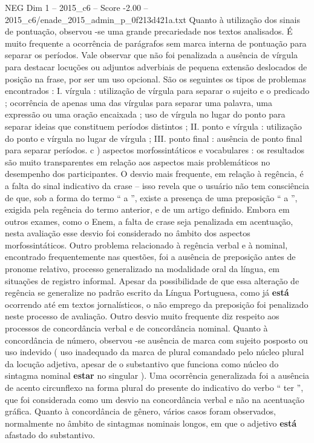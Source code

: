 \begin{textsample}{NEG Dim 1 – 2015\_c6 – Score -2.00 – 2015\_c6/enade\_2015\_admin\_p\_0f213d421a.txt}
Quanto à utilização dos sinais de pontuação, observou -se uma grande precariedade nos textos analisados.
É muito frequente a ocorrência de parágrafos sem marca interna de pontuação para separar os períodos.
Vale observar que não foi penalizada a ausência de vírgula para destacar locuções ou adjuntos adverbiais de pequena extensão deslocados de posição na frase, por ser um uso opcional.
São os seguintes os tipos de problemas encontrados : I. vírgula : utilização de vírgula para separar o sujeito e o predicado ; ocorrência de apenas uma das vírgulas para separar uma palavra, uma expressão ou uma oração encaixada ; uso de vírgula no lugar do ponto para separar ideias que constituem períodos distintos ; II. ponto e vírgula : utilização do ponto e vírgula no lugar de vírgula ; III. ponto final : ausência de ponto final para separar períodos. c ) aspectos morfossintáticos e vocabulares : os resultados são muito transparentes em relação aos aspectos mais problemáticos no desempenho dos participantes.
O desvio mais frequente, em relação à regência, é a falta do sinal indicativo da crase – isso revela que o usuário não tem consciência de que, sob a forma do termo “ a ”, existe a presença de uma preposição “ a ”, exigida pela regência do termo anterior, e de um artigo definido.
Embora em outros exames, como o Enem, a falta de crase seja penalizada em acentuação, nesta avaliação esse desvio foi considerado no âmbito dos aspectos morfossintáticos.
Outro problema relacionado à regência verbal e à nominal, encontrado frequentemente nas questões, foi a ausência de preposição antes de pronome relativo, processo generalizado na modalidade oral da língua, em situações de registro informal.
Apesar da possibilidade de que essa alteração de regência se generalize no padrão escrito da Língua Portuguesa, como já \textbf{está} ocorrendo até em textos jornalísticos, o não emprego da preposição foi penalizado neste processo de avaliação.
Outro desvio muito frequente diz respeito aos processos de concordância verbal e de concordância nominal.
Quanto à concordância de número, observou -se ausência de marca com sujeito posposto ou uso indevido ( uso inadequado da marca de plural comandado pelo núcleo plural da locução adjetiva, apesar de o substantivo que funciona como núcleo do sintagma nominal \textbf{estar} no singular ).
Uma ocorrência generalizada foi a ausência de acento circunflexo na forma plural do presente do indicativo do verbo “ ter ”, que foi considerada como um desvio na concordância verbal e não na acentuação gráfica.
Quanto à concordância de gênero, vários casos foram observados, normalmente no âmbito de sintagmas nominais longos, em que o adjetivo \textbf{está} afastado do substantivo.

\end{textsample}
